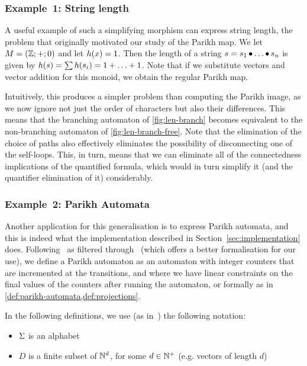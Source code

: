 \documentclass[acmsmall,review,anonymous,screen]{acmart}\settopmatter{printfolios=true,printccs=false,printacmref=true}
\theoremstyle{definition}
\newif\ifoutline
\newcommand{\contents}[1]{\ifoutline{\color{blue}
    \begin{itemize}
    #1
    \end{itemize}
  }\fi}
\begin{document}
\subsubsection{Example~1: String length}
A useful example of such a simplifying morphism can express string length, the
problem that originally motivated our study of the Parikh map. We let $M =
\left(\mathbb{Z};+;0\right)$ and let $h(x) = 1$. Then the length of a string
$s = s_1 \operatorname{\bullet} \ldots \operatorname{\bullet}  s_n$ is given by $h(s) = \sum h(s_i) = 1
+ \ldots + 1$. Note that if we substitute vectors and vector addition for
this monoid, we obtain the regular Parikh map.

Intuitively, this produces a simpler problem than computing the Parikh image, as
we now ignore not just the order of characters but also their differences. This
means that the branching automaton of \cref{fig:len-branch} becomes
equivalent to the non-branching automaton of \cref{fig:len-branch-free}.
Note that the elimination of the choice of paths also effectively eliminates the
possibility of disconnecting one of the self-loops. This, in turn, means that we
can eliminate all of the connectedness implications of the quantified formula,
which would in turn simplify it (and the quantifier elimination of it)
considerably.

\subsubsection{Example~2: Parikh Automata}\label{sec:parikh-automata}
\contents{\item Ostrich+!}

Another application for this generalisation is to express Parikh automata, and
this is indeed what the implementation described in
Section~\ref{sec:implementation} does. Following~\cite{parikh-automata} as
filtered through~\cite{expressiveness} (which offers a better formalisation for
our use), we define a Parikh automaton as an automaton with integer counters
that are incremented at the transitions, and where we have linear
constraints on the final values of the counters after running the automaton, or
formally as in \cref{def:parikh-automata,def:projections}.

In the following definitions, we use (as in~\cite{expressiveness}) the following notation:
\begin{itemize}
  \item $\Sigma$ is an alphabet
  \item $D$ is a finite subset of $\mathbb{N}^d$, for some $d \in \mathbb{N}^+$ (e.g. vectors of length $d$)
\end{itemize}
\end{document}
